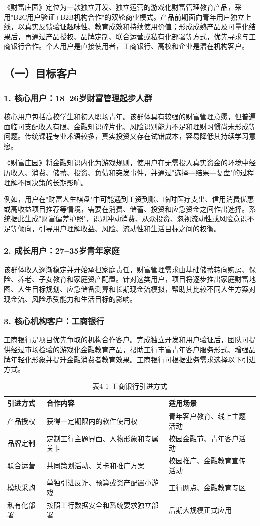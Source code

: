 \documentclass[12pt,a4paper]{ctexart}
\newcommand{\sect}[1]{\subsection*{#1}\addcontentsline{toc}{subsection}{#1}}
\newcommand{\sub}[1]{\subsubsection*{#1}}
\begin{document}
《财富庄园》定位为一款独立开发、独立运营的游戏化财富管理教育产品，采用"B2C用户验证+B2B机构合作"的双轮商业模式。产品前期面向青年用户独立上线，以真实反馈验证趣味性、教育成效和持续使用价值；形成成熟产品及可量化结果后，再通过产品授权、品牌定制、联合运营或私有化部署等方式，优先寻求与工商银行合作。个人用户是直接使用者，工商银行、高校和企业是潜在机构客户。

\sect{（一）目标客户}
\sub{1. 核心用户：18--26岁财富管理起步人群}
核心用户包括高校学生和初入职场青年。该群体具有较强的财富管理意愿，但普遍面临可支配收入有限、金融知识碎片化、风险识别能力不足和理财习惯尚未形成等问题。传统课程专业术语较多，真实投资又存在试错成本，容易降低其持续学习意愿。

《财富庄园》将金融知识内化为游戏规则，使用户在无需投入真实资金的环境中经历收入、消费、储蓄、投资、负债和突发事件，并通过"选择—结果—复盘"的过程理解不同决策的长期影响。

例如，用户在"财富人生棋盘"中可能遇到工资到账、临时医疗支出、信用消费优惠或高收益项目推荐等情境，需要在消费、储蓄、投资和应急资金之间作出选择。系统据此生成"财富偏差护照"，识别冲动消费、从众投资、忽视流动性或风险意识不足等倾向，引导用户理解收益、风险、流动性和生活目标之间的权衡。

\sub{2. 成长用户：27--35岁青年家庭}
该群体收入逐渐稳定并开始承担家庭责任，财富管理需求由基础储蓄转向购房、保险、养老、子女教育和家庭资产配置。针对这类用户，项目将逐步推出家庭财富地图、人生目标规划、应急储备测算和长期现金流模拟，帮助其比较不同人生方案对现金流、风险承受能力和生活目标的影响。

\sub{3. 核心机构客户：工商银行}
工商银行是项目优先争取的机构合作客户。完成独立开发和用户验证后，团队可提供经过市场检验的游戏化金融教育产品，帮助工行丰富青年客户服务形式、增强品牌年轻化形象并提升金融消费者教育效果。工商银行可根据业务需求选择以下引进方式。

\begin{table}[htbp]
\centering
\begin{tabular}{p{3cm}p{4.2cm}p{5.4cm}}
\toprule
\textbf{引进方式} & \textbf{合作内容} & \textbf{适用场景} \\
\midrule
产品授权 & 获得一定期限内的软件使用权 & 青年客户教育、线上主题活动 \\
品牌定制 & 定制工行主题界面、人物形象和专属关卡 & 校园金融节、青年客户活动 \\
联合运营 & 共同策划活动、关卡和推广方案 & 校园推广、金融教育宣传活动 \\
模块采购 & 单独引进反诈、预算或资产配置小游戏 & 工行网点、金融教育专区 \\
私有化部署 & 按照工行数据安全和系统要求独立部署 & 后期大规模正式应用 \\
\bottomrule
\end{tabular}
\caption*{表4-1 \quad 工商银行引进方式}
\end{table}
\end{document}
